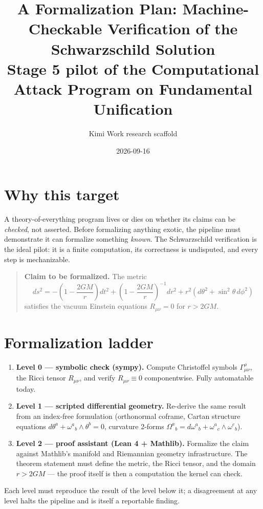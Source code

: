 \documentclass[11pt]{article}
\title{A Formalization Plan: Machine-Checkable Verification of the Schwarzschild Solution\\[4pt]
\large Stage 5 pilot of the Computational Attack Program on Fundamental Unification}
\author{Kimi Work research scaffold}
\date{2026-09-16}
\begin{document}
\maketitle

\section{Why this target}
A theory-of-everything program lives or dies on whether its claims can be \emph{checked},
not asserted. Before formalizing anything exotic, the pipeline must demonstrate it can
formalize something \emph{known}. The Schwarzschild verification is the ideal pilot:
it is a finite computation, its correctness is undisputed, and every step is
mechanizable.

\begin{quote}
\textbf{Claim to be formalized.} The metric
\[
  ds^2 = -\left(1-\frac{2GM}{r}\right)dt^2
        + \left(1-\frac{2GM}{r}\right)^{-1}dr^2
        + r^2\left(d\theta^2 + \sin^2\theta\,d\phi^2\right)
\]
satisfies the vacuum Einstein equations $R_{\mu\nu} = 0$ for $r > 2GM$.
\end{quote}

\section{Formalization ladder}
\begin{enumerate}
  \item \textbf{Level 0 --- symbolic check (sympy).} Compute Christoffel symbols
        $\Gamma^{\rho}_{\mu\nu}$, the Ricci tensor $R_{\mu\nu}$, and verify
        $R_{\mu\nu} \equiv 0$ componentwise. Fully automatable today.
  \item \textbf{Level 1 --- scripted differential geometry.} Re-derive the same result
        from an index-free formulation (orthonormal coframe, Cartan structure equations
        $d\theta^a + \omega^a{}_b \wedge \theta^b = 0$, curvature 2-forms
        $\Omega^a{}_b = d\omega^a{}_b + \omega^a{}_c \wedge \omega^c{}_b$).
  \item \textbf{Level 2 --- proof assistant (Lean 4 + Mathlib).} Formalize the claim
        against Mathlib's manifold and Riemannian geometry infrastructure. The theorem
        statement must define the metric, the Ricci tensor, and the domain
        $r > 2GM$ --- the proof itself is then a computation the kernel can check.
\end{enumerate}
Each level must reproduce the result of the level below it; a disagreement at any
level halts the pipeline and is itself a reportable finding.
\end{document}
